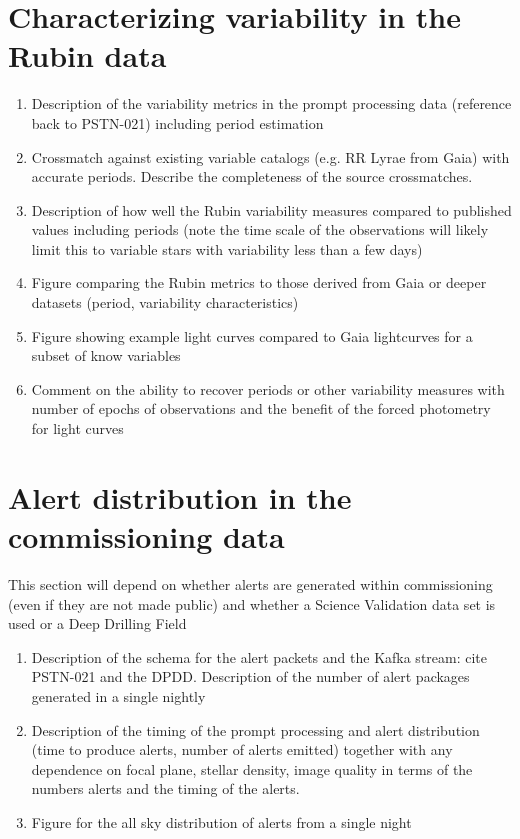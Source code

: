 \section{Characterizing variability in the Rubin data}

\begin{enumerate}

    \item Description of the variability metrics in the prompt processing data (reference back to PSTN-021) including period estimation
    \item Crossmatch against existing variable catalogs (e.g. RR Lyrae from Gaia) with accurate periods. Describe the completeness of the 
    source crossmatches. 
    \item Description of how well the Rubin variability measures compared to published values including periods (note the time scale of the observations
    will likely limit this to variable stars with variability less than a few days)
    \item Figure comparing the Rubin metrics to those derived from Gaia or deeper datasets (period, variability characteristics)
    \item Figure showing example light curves compared to Gaia lightcurves for a subset of know variables
    \item Comment on the ability to recover periods or other variability measures with number of epochs of observations and the benefit of the 
    forced photometry for light curves

\end{enumerate}

\section{Alert distribution in the commissioning data}

This section will depend on whether alerts are generated within commissioning (even if they are not made public) and whether a Science Validation data set is used or 
a Deep Drilling Field

\begin{enumerate}

    \item Description of the schema for the alert packets and the Kafka stream: cite PSTN-021 and the DPDD. Description of the number of 
    alert packages generated in a single nightly
    \item Description of the timing of the prompt processing and alert distribution (time to produce alerts, number of alerts emitted) together with
    any dependence on focal plane, stellar density, image quality in terms of the numbers alerts and the timing of the alerts.
    \item Figure for the all sky distribution of alerts from a single night
    
\end{enumerate}

